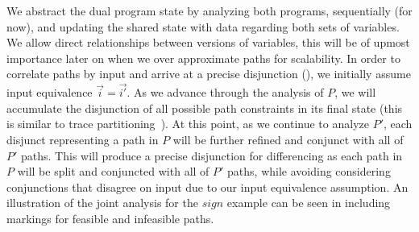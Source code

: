 We abstract the dual program state by analyzing both programs, sequentially (for now), and updating the shared state with data regarding both sets of variables. We allow direct relationships between versions of variables, this will be of upmost importance later on when we over approximate paths for scalability. In order to correlate paths by input and arrive at a precise disjunction (), we initially assume input equivalence $\vec{i} = \vec{i'}$. As we advance through the analysis of $P$, we will accumulate the disjunction of all possible path constraints in its final state (this is similar to trace partitioning~\cite{}). At this point, as we continue to analyze $P'$, each disjunct representing a path in $P$ will be further refined and conjunct with all of $P'$ paths. This will produce a precise disjunction for differencing as each path in $P$ will be split and conjuncted with all of $P'$ paths, while avoiding considering conjunctions that disagree on input due to our input equivalence assumption. An illustration of the joint analysis for the $sign$ example can be seen in  including markings for feasible and infeasible paths.


